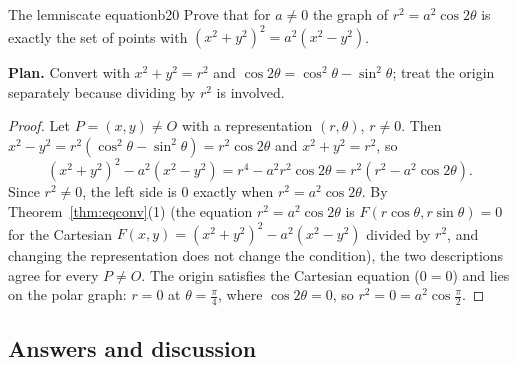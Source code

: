 \documentclass[11pt]{article}
\begin{document}
\begin{exmp}{The lemniscate equation}{b20}
Prove that for $a\ne0$ the graph of $r^2=a^2\cos2\theta$ is exactly the set of points with $(x^2+y^2)^2=a^2(x^2-y^2)$.

\textbf{Plan.} Convert with $x^2+y^2=r^2$ and $\cos2\theta=\cos^2\theta-\sin^2\theta$; treat the origin separately because dividing by $r^2$ is involved.

\begin{proof}
Let $P=(x,y)\ne O$ with a representation $(r,\theta)$, $r\ne0$. Then $x^2-y^2=r^2\left(\cos^2\theta-\sin^2\theta\right)=r^2\cos2\theta$ and $x^2+y^2=r^2$, so
\[
(x^2+y^2)^2-a^2(x^2-y^2)=r^4-a^2r^2\cos2\theta=r^2\left(r^2-a^2\cos2\theta\right).
\]
Since $r^2\ne0$, the left side is $0$ exactly when $r^2=a^2\cos2\theta$. By Theorem~\ref{thm:eqconv}(1) (the equation $r^2=a^2\cos2\theta$ is $F(r\cos\theta,r\sin\theta)=0$ for the Cartesian $F(x,y)=(x^2+y^2)^2-a^2(x^2-y^2)$ divided by $r^2$, and changing the representation does not change the condition), the two descriptions agree for every $P\ne O$. The origin satisfies the Cartesian equation ($0=0$) and lies on the polar graph: $r=0$ at $\theta=\frac\pi4$, where $\cos2\theta=0$, so $r^2=0=a^2\cos\frac\pi2$.
\end{proof}
\end{exmp}

\subsection*{Answers and discussion}
\end{document}
